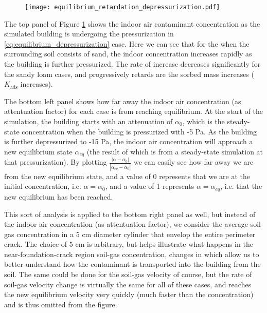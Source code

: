 \begin{figure}[!htb]
  \texttt{[image: equilibrium\_retardation\_depressurization.pdf]}
  \caption{}
  \label{fig:equilibrium_depressurization}
\end{figure}

The top panel of Figure \ref{fig:equilibrium_depressurization} shows the indoor air contaminant concentration as the simulated building is undergoing the pressurization in \eqref{eq:equilibrium_depressurization} case.
Here we can see that for the when the surrounding soil consists of sand, the indoor concentration increases rapidly as the building is further pressurized.
The rate of increase decreases significantly for the sandy loam cases, and progressively retards are the sorbed mass increases ($K_\mathrm{ads}$ increases).\par

The bottom left panel shows how far away the indoor air concentration (as attentuation factor) for each case is from reaching equilibrium.
At the start of the simulation, the building starts with an attenuation of $\alpha_0$, which is the steady-state concentration when the building is pressurized with -5 Pa.
As the building is further depressurized to -15 Pa, the indoor air concentration will approach a new equilibrium state $\alpha_{eq}$ (the result of which is from a steady-state simulation at that pressurization).
By plotting $\frac{|\alpha-\alpha_0|}{|\alpha_{eq}-\alpha_0|}$ we can easily see how far away we are from the new equilibrium state, and a value of 0 represents that we are at the initial concentration, i.e. $\alpha = \alpha_0$, and a value of 1 represents $\alpha = \alpha_{eq}$, i.e. that the new equilibrium has been reached.\par

This sort of analysis is applied to the bottom right panel as well, but instead of the indoor air concentration (as attentuation factor), we consider the average soil-gas concentration in a 5 cm diameter cylinder that envelop the entire perimeter crack.
The choice of 5 cm is arbitrary, but helps illustrate what happens in the near-foundation-crack region soil-gas concentration, changes in which allow us to better understand how the contaminant is transported into the building from the soil.
The same could be done for the soil-gas velocity of course, but the rate of soil-gas velocity change is virtually the same for all of these cases, and reaches the new equilibrium velocity very quickly (much faster than the concentration) and is thus omitted from the figure.\par

